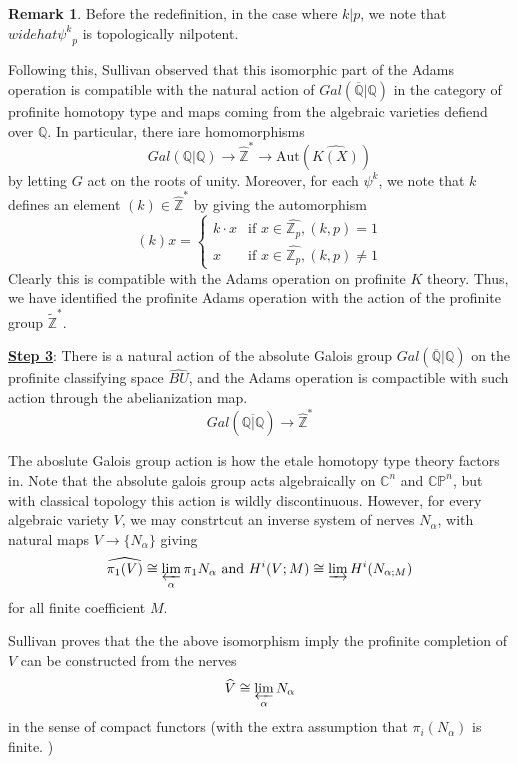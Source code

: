 \documentclass{article}
\theoremstyle{definition}
\theoremstyle{definition}
\theoremstyle{definition}
\newtheorem{remark}{Remark}[theorem]
\theoremstyle{definition}
\theoremstyle{definition}
\theoremstyle{definition}
\theoremstyle{definition}
\begin{document}
\begin{tcolorbox}[colback=green!5!white,colframe=green!30!white]
\begin{remark}
Before the redefinition, in the case where $k|p$, we note that$ widehat{\psi^k}_p$ is topologically nilpotent. 
\end{remark}
\end{tcolorbox}

Following this, Sullivan observed that this isomorphic part of the Adams operation is compatible with the natural action of $Gal(\overline{\mathbb{Q}}|\mathbb{Q})$ in the category of profinite homotopy type and maps coming from the algebraic varieties defiend over $\mathbb{Q}$. In particular, there iare homomorphisms
\[Gal(\mathbb{Q}|\mathbb{Q})\to \widehat{\mathbb{Z}}^*\to \textrm{Aut}(\widehat{K(X)})\]
by letting $G$ act on the roots of unity. Moreover, for each $\psi^k$, we note that $k$ defines an element $(k)\in \widehat{\mathbb{Z}}^*$ by giving the automorphism 
\[(k)x=\begin{cases}
	k\cdot x & \textrm{if } x\in \widehat{\mathbb{Z}_p}, (k,p)=1\\
	x & \textrm{if } x\in  \widehat{\mathbb{Z}_p}, (k,p)\neq 1
\end{cases}\]
Clearly this is compatible with the Adams operation on profinite $K$ theory. Thus, we have identified the profinite Adams operation with the action of the profinite group $\widetilde{\mathbb{Z}}^*$. 

\underline{\textbf{Step 3}}: There is a natural action of the absolute Galois group $Gal(\overline{\mathbb{Q}}|\mathbb{Q})$ on the profinite classifying space $\widehat{BU}$, and the Adams operation is compactible with such action through the abelianization map.
\[Gal(\overline{\mathbb{Q}|\mathbb{Q}})\to \widehat{\mathbb{Z}}^*\]

The aboslute Galois group action is how the etale homotopy type theory factors in. Note that the absolute galois group acts algebraically on $\mathbb{C}^n$ and $\mathbb{CP}^n$, but with classical topology this action is wildly discontinuous. However, for every algebraic variety $V$, we may constrtcut an inverse system of nerves $N_{\alpha}$, with natural maps $V\to \{N_{\alpha}\}$ giving 
\[\widehat{\pi_1(V)}\cong \varprojlim_{\alpha}\pi_1N_{\alpha} \textrm{   and   } H^i(V; M)\cong \varinjlim H^i(N_{\alpha; M})\]
 for all finite coefficient $M$.


Sullivan proves that the the above isomorphism imply the profinite completion of $V$ can be constructed from the nerves 
\[\widehat{V}\cong \varprojlim_{\alpha} N_{\alpha}\]
in the sense of compact functors (with the extra assumption that $\pi_i(N_{\alpha})$ is finite. )
\end{document}
